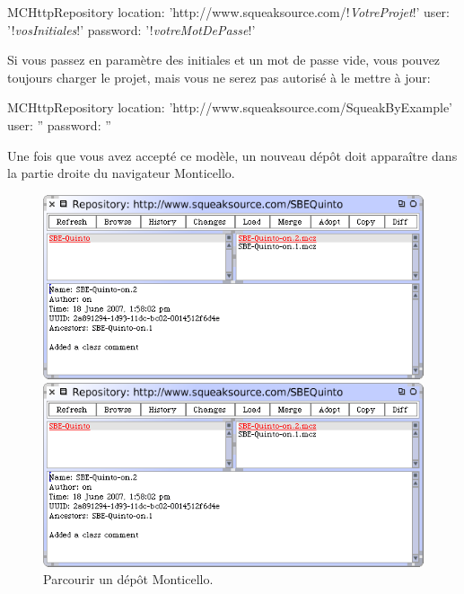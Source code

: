 \documentclass[a4paper,10pt,twoside]{book}
\begin{document}
\begin{code}{}
MCHttpRepository 
    location: 'http://www.squeaksource.com/!\emph{VotreProjet}!'
    user: '!\emph{vosInitiales}!' 
    password: '!\emph{votreMotDePasse}!'
\end{code}   

\noindent
Si vous passez en paramètre des initiales et un mot de passe vide,
vous pouvez toujours charger le projet, mais vous ne serez pas
autorisé à le mettre à jour:

\begin{code}{}
MCHttpRepository 
    location: 'http://www.squeaksource.com/SqueakByExample'
    user: '' 
    password: ''
\end{code}   

Une fois que vous avez accepté ce modèle, un nouveau dépôt doit
apparaître dans la partie droite du navigateur Monticello.

\begin{figure}[hbt]
\ifluluelse
	{\centerline {\includegraphics[width=\textwidth]{BrowseRepository}}}
	{\centerline {\includegraphics[scale=0.7]{BrowseRepository}}}
\caption{Parcourir un dépôt Monticello.
\label{fig:monticello3}}
\end{figure}
\end{document}
